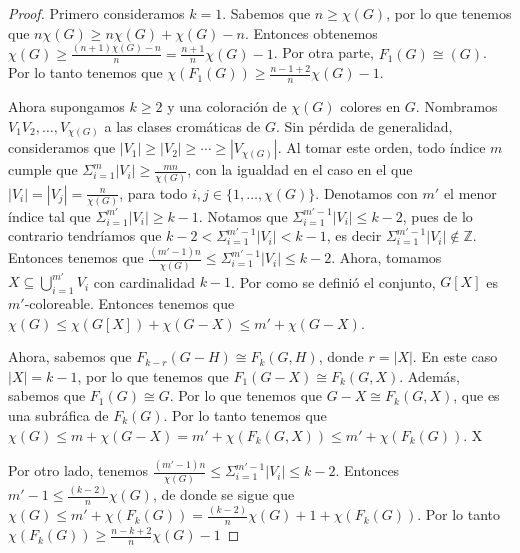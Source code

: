         \begin{proof}
        Primero consideramos $k=1$. Sabemos que $n \geq \chi(G)$, por lo que
        tenemos que $n\chi(G) \geq n\chi(G) + \chi(G) -n$. Entonces obtenemos
        $\chi (G) \geq \frac{(n+1)\chi(G)-n}{n} = \frac{n+1}{n}\chi (G) -1$.
        Por otra parte, $F_1(G) \cong (G)$. Por lo tanto tenemos que
        $\chi(F_1(G)) \geq \frac{n-1+2}{n} \chi(G) -1$.
        
            Ahora supongamos $k \geq 2$ y una coloraci\'on de $\chi(G)$ colores
            en $G$. Nombramos $V_1 V_2, \dots, V_{\chi(G)}$ a las clases
            crom\'aticas de $G$. Sin p\'erdida de generalidad, consideramos que
            $|V_1|\geq |V_2|\geq \cdots \geq |V_{\chi(G)}|$. Al tomar este
            orden, todo \'indice $m$ cumple que $\Sigma_{i=1}^{m}|V_i| \geq
            \frac{mn}{\chi(G)}$, con la igualdad en el caso en el que $|V_i| =
            |V_j| = \frac{n}{\chi(G)}$, para todo $i,j \in \{1, \dots,
            \chi(G)\}$. Denotamos con $m'$ el menor \'indice tal que
            $\Sigma_{i=1}^{m'}|V_i| \geq k-1$. Notamos que
            $\Sigma_{i=1}^{m'-1}|V_i| \leq k-2$, pues de lo contrario
            tendr\'iamos que $k-2<\Sigma_{i=1}^{m'-1}|V_i| < k-1$, es decir
            $\Sigma_{i=1}^{m'-1}|V_i| \notin \mathbb{Z}$. Entonces tenemos que
            $\frac{(m'-1)n}{\chi(G)}\leq \Sigma_{i=1}^{m'-1}|V_i| \leq k-2$.
            Ahora, tomamos $X \subseteq \bigcup_{i=1}^{m'} V_i$ con cardinalidad
            $k-1$. Por como se defini\'o el conjunto, $G[X]$ es $m'$-coloreable.
            Entonces tenemos que  $\chi(G) \leq \chi(G[X])+\chi(G-X) \leq m' +
            \chi(G-X)$.
        
            Ahora, sabemos que $F_{k-r}(G-H) \cong F_k(G,H)$, donde $r = |X|$.
            En este caso $|X| = k-1$, por lo que tenemos que $F_1(G-X) \cong
            F_k(G,X)$. Adem\'as, sabemos que $F_1(G) \cong G$. Por lo que
            tenemos que $G-X \cong F_k(G,X)$, que es una subr\'afica de
            $F_k(G)$. Por lo tanto tenemos que $\chi(G) \leq m + \chi(G-X) = m'
            + \chi(F_k(G,X)) \leq m' + \chi(F_k(G))$. X
            
            Por otro lado, tenemos $\frac{(m'-1)n}{\chi(G)}\leq
            \Sigma_{i=1}^{m'-1}|V_i| \leq k-2$. Entonces $m'-1 \leq
            \frac{(k-2)}{n}\chi(G)$, de donde se sigue que $\chi(G) \leq m' +
            \chi(F_k(G)) = \frac{(k-2)}{n}\chi(G) +1 + \chi(F_k(G))$. Por lo
            tanto $\chi(F_k(G)) \geq \frac{n-k+2}{n} \chi(G) -1$
        \end{proof}

